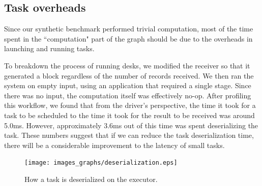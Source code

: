 %
%
\subsection{Task overheads}

Since our synthetic benchmark performed trivial computation, most of the time spent in the ``computation" part of the graph should be due to the overheads in launching and running tasks. 

To breakdown the process of running desks, we modified the receiver so that it generated a block regardless of the number of records received. We then ran the system on empty input, using an application that required a single stage. Since there was no input, the computation itself was effectively no-op. After profiling this workflow, we found that from the driver's perspective, the time it took for a task to be scheduled to the time it took for the result to be received was around 5.0ms. However, approximately 3.6ms out of this time was spent deserializing the task. These numbers suggest that if we can reduce the task deserialization time, there will be a considerable improvement to the latency of small tasks.

\begin{figure}[t!]
 \begin{center}
   \texttt{[image: images\_graphs/deserialization.eps]}
 \end{center}
 \caption{How a task is deserialized on the executor. }
 \label{fig:deserialization}
\end{figure}

